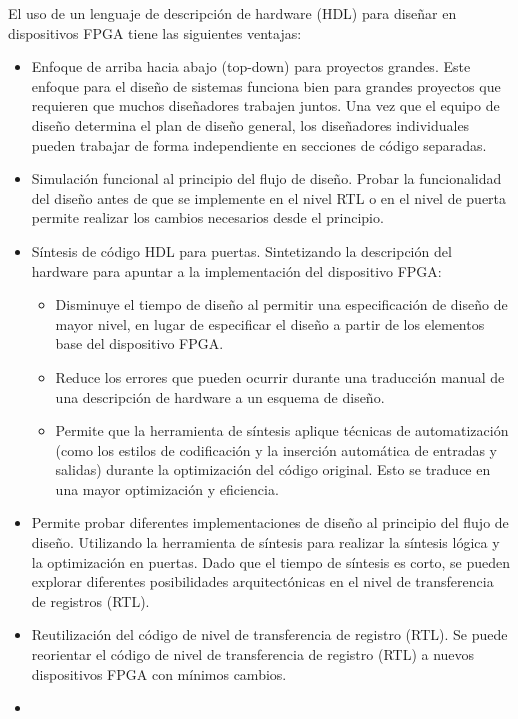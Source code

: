 El uso de un lenguaje de descripción de hardware (HDL) para diseñar en dispositivos FPGA tiene las siguientes ventajas:
\begin{itemize}
\item
Enfoque de arriba hacia abajo (top-down) para proyectos grandes.
Este enfoque para el diseño de sistemas funciona bien para grandes proyectos que requieren que muchos diseñadores trabajen juntos. Una vez que el equipo de diseño determina el plan de diseño general, los diseñadores individuales pueden trabajar de forma independiente en secciones de código separadas.
\item
Simulación funcional al principio del flujo de diseño.
Probar la funcionalidad del diseño antes de que se implemente en el nivel RTL o en el nivel de puerta permite realizar los cambios necesarios desde el principio.

\item
Síntesis de código HDL para puertas. Sintetizando la descripción del hardware para apuntar a la implementación del dispositivo FPGA:

	\begin{itemize}
	\item
	Disminuye el tiempo de diseño al permitir una especificación de diseño de mayor nivel, en lugar de especificar el diseño a partir de los elementos base del dispositivo FPGA.
	\item
	Reduce los errores que pueden ocurrir durante una traducción manual de una descripción de hardware a un esquema de diseño.
	\item
	Permite que la herramienta de síntesis aplique técnicas de automatización (como los estilos de codificación y la inserción automática de entradas y salidas) durante la optimización del código original. Esto se traduce en una mayor optimización y eficiencia.
	\end{itemize}


\item
Permite probar diferentes implementaciones de diseño al principio del flujo de diseño. Utilizando la herramienta de síntesis para realizar la síntesis lógica y la optimización en puertas. Dado que el tiempo de síntesis es corto, se pueden explorar diferentes posibilidades arquitectónicas en el nivel de transferencia de registros (RTL).
\item
Reutilización del código de nivel de transferencia de registro (RTL).
Se puede reorientar el código de nivel de transferencia de registro (RTL) a nuevos dispositivos FPGA con mínimos cambios.
\item

\end{itemize}

